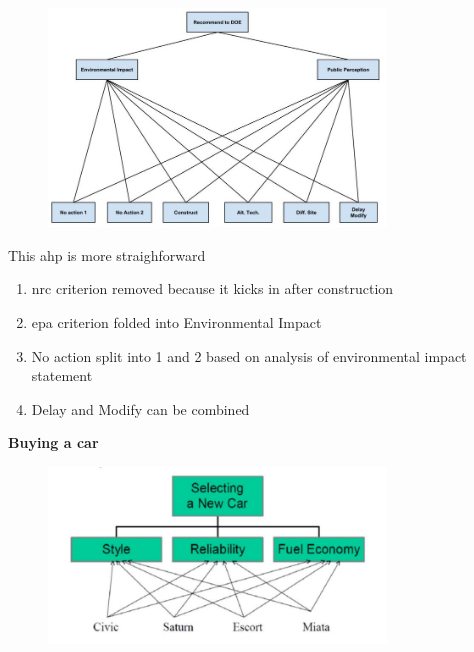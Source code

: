 \documentclass[aspectratio=1610,pdftex,dvipsnames,compress,xcolor={dvipsnames}]{beamer}
\newcommand{\acs}{\acrshort} %
\begin{document}
\begin{frame}{}
    \begin{figure}
        \centering
        \includegraphics[width=0.80\textwidth]{ahp_final.jpg}
    \end{figure}
\end{frame}


\begin{frame}{This \acs{ahp} is more straighforward}
    \begin{enumerate}[series=outerlist,topsep=0pt,itemsep=21pt,leftmargin=*,label=(\arabic*)]
        \item[]\acs{nrc} criterion removed because it kicks in after construction
        \item[]\acs{epa} criterion folded into Environmental Impact
        \item[]No action split into 1 and 2 based on analysis of environmental impact statement
        \item[]Delay and Modify can be combined
    \end{enumerate}
\end{frame}


\begin{frame}[plain]{}
    \centering\LARGE\textbf{Buying a car}
\end{frame}


\addtocounter{framenumber}{-1}
\begin{frame}{}
    \begin{figure}
        \centering
        \includegraphics[width=0.80\textwidth]{ahp.car.jpg}
    \end{figure}
\end{frame}
\end{document}
